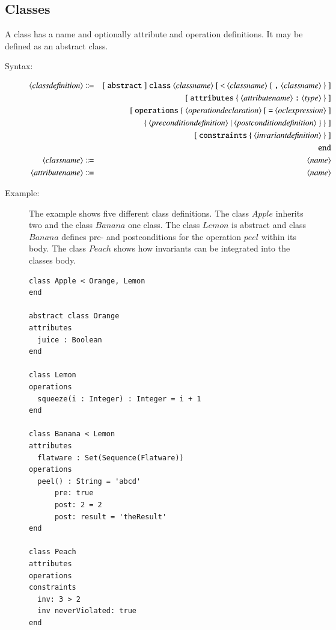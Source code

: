 \documentclass[a4paper,titlepage,oneside,final]{scrreprt} %
\begin{document}
\subsection{Classes}
A class  has a name and optionally attribute and operation definitions.
It may be defined as an abstract class.
\begin{description}
\item[Syntax:]
\begin{eqnarray*}
\langle\mathit{classdefinition}\rangle &\Coloneqq& [~\verb+abstract+~]~\verb+class+~
\langle\mathit{classname}\rangle~[~\verb+<+~\langle\mathit{classname}\rangle~
\{~\verb+,+~\langle\mathit{classname}\rangle~\}~]\\
&&[~\verb+attributes+~\{~\langle\mathit{attributename}\rangle
~\verb+:+~\langle\mathit{type}\rangle~\}~]\\
&&[~\verb+operations+~\{~\langle\mathit{operationdeclaration}\rangle
~[~\verb+=+~\langle\mathit{oclexpression}\rangle~]\\
&&\{~\langle\mathit{preconditiondefinition}\rangle~|~
\langle\mathit{postconditiondefinition}\rangle~\}~\}~]\\
&& [~\verb+constraints+~\{~\langle\mathit{invariantdefinition}\rangle~\}~]\\
&& \verb+end+\\
\langle\mathit{classname}\rangle &\Coloneqq& \langle\mathit{name}\rangle\\
\langle\mathit{attributename}\rangle &\Coloneqq& \langle\mathit{name}\rangle
\end{eqnarray*}
\item[Example:] The example shows five different class definitions.
The class $\mathit{Apple}$ inherits two and the class
$\mathit{Banana}$ one class.
The class $\mathit{Lemon}$ is abstract and class $\mathit{Banana}$ defines pre- and postconditions
for the operation $\mathit{peel}$ within its body.
The class $\mathit{Peach}$ shows how invariants can be integrated
into the classes body.
\begin{verbatim}
class Apple < Orange, Lemon
end

abstract class Orange
attributes
  juice : Boolean
end

class Lemon
operations
  squeeze(i : Integer) : Integer = i + 1
end

class Banana < Lemon
attributes
  flatware : Set(Sequence(Flatware))
operations
  peel() : String = 'abcd'
      pre: true
      post: 2 = 2
      post: result = 'theResult'
end

class Peach
attributes
operations
constraints
  inv: 3 > 2
  inv neverViolated: true
end
\end{verbatim}
\end{description}
\end{document}
